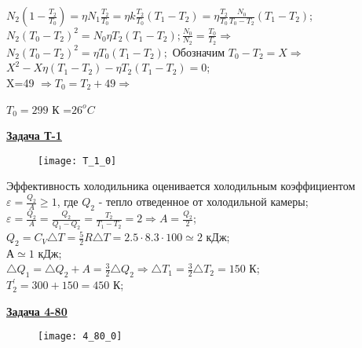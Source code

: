 \documentclass[12pt]{article}
\begin{document}
{{$N_2(1-\frac{T_2}{T_0})=\eta N_1\frac{T_2}{T_0}=\eta k\frac{T_2}{T_0}(T_1-T_2)=\eta \frac{T_2}{T_0}\frac{N_0}{T_0-T_2}(T_1-T_2)$;\\

$N_2(T_0-T_2)^2=N_0\eta T_2(T_1-T_2); \frac{N_0}{N_2}=\frac{T_0}{T_2}\Rightarrow$\\

$N_2(T_0-T_2)^2=\eta T_0(T_1-T_2);$ Обозначим $T_0-T_2=X \Rightarrow$\\

$X^2-X\eta (T_1-T_2)-\eta T_2(T_1-T_2)=0$;\\

X=49 $\Rightarrow T_0=T_2+49 \Rightarrow$

$T_0=299$ К =$26^oC$









\newpage


{\underline\bf Задача Т-1}


\begin{figure}[h]
\texttt{[image: T\_1\_0]}
\end{figure}

\vspace{1cm}

Эффективность холодильника оценивается холодильным коэффициентом $\varepsilon=\frac{Q_2}{A}\geq 1$, где $Q_2$ - тепло отведенное от холодильной камеры;\\

 $\varepsilon=\frac{Q_2}{A}=\frac{Q_2}{Q_1-Q_2}=\frac{T_2}{T_1-T_2}=2\Rightarrow A=\frac{Q_2}{2}$;\\

 $Q_2=C_V \triangle T=\frac{5}{2}R\triangle T=2.5\cdot 8.3\cdot100\simeq 2$ кДж;\\

 $А\simeq 1$ кДж;\\

 $\triangle Q_1=\triangle Q_2+A=\frac{3}{2}\triangle Q_2\Rightarrow \triangle T_1=\frac{3}{2}\triangle T_2=150$ К;\\

 $T^\prime_2=300+150=450$ К;

\newpage

{\underline\bf Задача 4-80}

\begin{figure}[h]
\texttt{[image: 4\_80\_0]}
\end{figure}

}}
\end{document}
